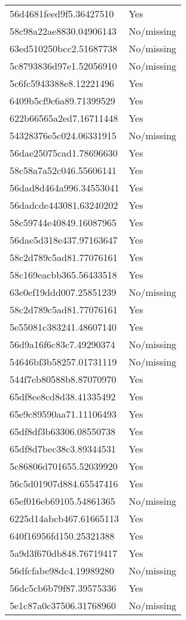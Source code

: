\begin{tabular}{ll}
56d4681feed9f5.36427510 & Yes \\
58c98a22ae8830.04906143 & No/missing \\
63ed510250bcc2.51687738 & No/missing \\
5c8793836d97e1.52056910 & No/missing \\
5c6fc5943388e8.12221496 & Yes \\
6409b5cf9c6a89.71399529 & Yes \\
622b66565a2ed7.16711448 & Yes \\
54328376e5c024.06331915 & No/missing \\
56dae25075cad1.78696630 & Yes \\
58c58a7a52c046.55606141 & Yes \\
56dad8d464a996.34553041 & Yes \\
56dadcde443081.63240202 & Yes \\
58c59744e40849.16087965 & Yes \\
56dae5d318e437.97163647 & Yes \\
58c2d789c5ad81.77076161 & Yes \\
58c169eacbb365.56433518 & Yes \\
63e0ef19ddd007.25851239 & No/missing \\
58c2d789c5ad81.77076161 & Yes \\
5e55081c383241.48607140 & Yes \\
56d9a16f6c83c7.49290374 & No/missing \\
54646bf3b58257.01731119 & No/missing \\
544f7eb80588b8.87070970 & Yes \\
65df8ee8cd8d38.41335492 & Yes \\
65e9c89590aa71.11106493 & Yes \\
65df8df3b63306.08550738 & Yes \\
65df8d7bec38c3.89344531 & Yes \\
5c86806d701655.52039920 & Yes \\
56c5d01907d884.65547416 & Yes \\
65ef016eb69105.54861365 & No/missing \\
6225d14abcb467.61665113 & Yes \\
640f16956fd150.25321388 & Yes \\
5a9d3f670db848.76719417 & Yes \\
56dfcfabe98dc4.19989280 & No/missing \\
56dc5cb6b79f87.39575336 & Yes \\
5e1c87a0c37506.31768960 & No/missing \\

\end{tabular}
